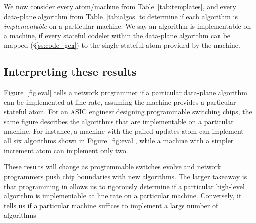 We now consider every atom/\absmachine machine from Table~\ref{tab:templates},
and every data-plane algorithm from Table~\ref{tab:algos} to determine if each
algorithm is \textit{implementable} on a particular \absmachine machine. We
say an algorithm is implementable on a \absmachine machine, if every stateful
codelet within the data-plane algorithm can be mapped (\S\ref{ss:code_gen}) to
the single stateful atom provided by the \absmachine machine.

\subsection{Interpreting these results}
Figure~\ref{fig:eval} tells a network programmer if a particular data-plane
algorithm can be implemented at line rate, assuming the \absmachine machine
provides a particular stateful atom. For an ASIC engineer designing
programmable switching chips, the same figure describes the algorithms that are
implementable on a particular \absmachine machine. For instance, a \absmachine
machine with the paired updates atom can implement all six algorithms shown in
Figure~\ref{fig:eval}, while a machine with a simpler increment atom can
implement only two.

These results will change as programmable switches evolve and network
programmers push chip boundaries with new algorithms.  The larger takeaway is
that programming in \pktlanguage allows us to rigorously determine if a
particular high-level algorithm is implementable at line rate on a particular
\absmachine machine. Conversely, it tells us if a particular \absmachine
machine suffices to implement a large number of algorithms.
